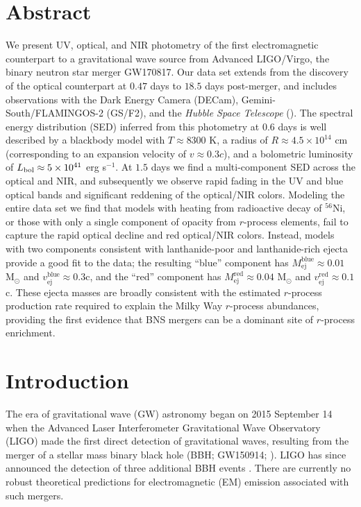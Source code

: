 
\section*{Abstract}
We present UV, optical, and NIR photometry of the first electromagnetic counterpart to a gravitational wave source from Advanced LIGO/Virgo, the binary neutron star merger GW170817. Our data set extends from the discovery of the optical counterpart at $0.47$ days to $18.5$ days post-merger, and includes observations with the Dark Energy Camera (DECam), Gemini-South/FLAMINGOS-2 (GS/F2), and the {\it Hubble Space Telescope} (\HST). The spectral energy distribution (SED) inferred from this photometry at $0.6$ days is well described by a blackbody model with $T\approx 8300$ K, a radius of $R\approx 4.5\times 10^{14}$ cm (corresponding to an expansion velocity of $v\approx 0.3c$), and a bolometric luminosity of $L_{\rm bol}\approx 5\times10^{41}$ erg s$^{-1}$. At $1.5$ days we find a multi-component SED across the optical and NIR, and subsequently we observe rapid fading in the UV and blue optical bands and significant reddening of the optical/NIR colors. Modeling the entire data set we find that models with heating from radioactive decay of $^{56}$Ni, or those with only a single component of opacity from $r$-process elements, fail to capture the rapid optical decline and red optical/NIR colors. Instead, models with two components consistent with lanthanide-poor and lanthanide-rich ejecta provide a good fit to the data; the resulting ``blue'' component has $M_\mathrm{ej}^\mathrm{blue}\approx 0.01$ M$_\odot$ and $v_\mathrm{ej}^\mathrm{blue}\approx 0.3$c, and the ``red'' component has $M_\mathrm{ej}^\mathrm{red}\approx 0.04$ M$_\odot$ and $v_\mathrm{ej}^\mathrm{red}\approx 0.1$c. These ejecta masses are broadly consistent with the estimated $r$-process production rate required to explain the Milky Way $r$-process abundances, providing the first evidence that BNS mergers can be a dominant site of $r$-process enrichment.

\section{Introduction}
\label{sec:ch5_intro}
The era of gravitational wave (GW) astronomy began on 2015 September 14 when the Advanced Laser Interferometer Gravitational Wave Observatory (LIGO) made the first direct detection of gravitational waves, resulting from the merger of a stellar mass binary black hole (BBH; GW150914; \citealt{LIGOGW150914}). LIGO has since announced the detection of three additional BBH events \citep{LIGOGW151226,LIGOGW170104,LIGOGW170814}.  There are currently no robust theoretical predictions for electromagnetic (EM) emission associated with such mergers.

